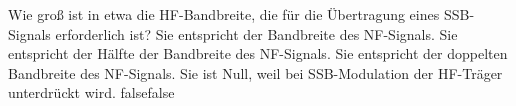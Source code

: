     {Wie groß ist in etwa die HF-Bandbreite, die für die Übertragung eines SSB-Signals erforderlich ist?}
    {Sie entspricht der Bandbreite des NF-Signals.}
    {Sie entspricht der Hälfte der Bandbreite des NF-Signals.}
    {Sie entspricht der doppelten Bandbreite des NF-Signals.}
    {Sie ist Null, weil bei SSB-Modulation der HF-Träger unterdrückt wird.}
    {false}{false}